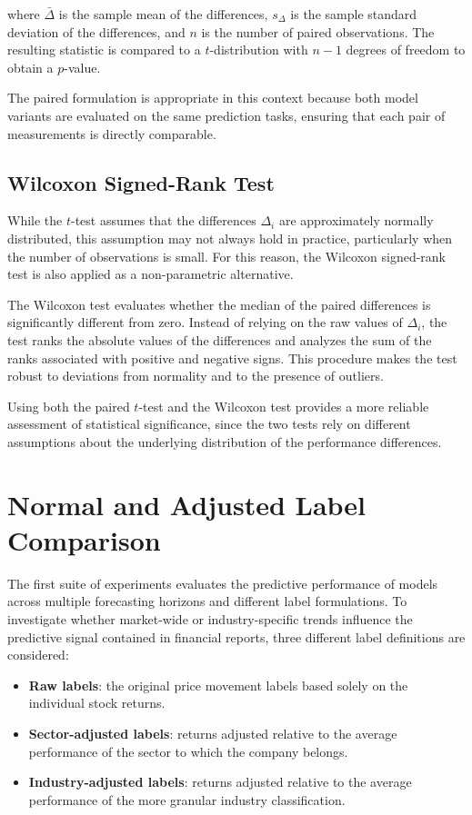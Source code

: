 where $\bar{\Delta}$ is the sample mean of the differences, $s_\Delta$ is the sample standard deviation of the differences, and $n$ is the number of paired observations. The resulting statistic is compared to a $t$-distribution with $n-1$ degrees of freedom to obtain a $p$-value.

The paired formulation is appropriate in this context because both model variants are evaluated on the same prediction tasks, ensuring that each pair of measurements is directly comparable.

\subsection{Wilcoxon Signed-Rank Test}

While the $t$-test assumes that the differences $\Delta_i$ are approximately normally distributed, this assumption may not always hold in practice, particularly when the number of observations is small. For this reason, the Wilcoxon signed-rank test is also applied as a non-parametric alternative.

The Wilcoxon test evaluates whether the median of the paired differences is significantly different from zero. Instead of relying on the raw values of $\Delta_i$, the test ranks the absolute values of the differences and analyzes the sum of the ranks associated with positive and negative signs. This procedure makes the test robust to deviations from normality and to the presence of outliers.

Using both the paired $t$-test and the Wilcoxon test provides a more reliable assessment of statistical significance, since the two tests rely on different assumptions about the underlying distribution of the performance differences.

\section{Normal and Adjusted Label Comparison}

The first suite of experiments evaluates the predictive performance of models across multiple forecasting horizons and different label formulations.
To investigate whether market-wide or industry-specific trends influence the predictive signal contained in financial reports, three different label definitions are considered:

\begin{itemize}
\item \textbf{Raw labels}: the original price movement labels based solely on the individual stock returns.
\item \textbf{Sector-adjusted labels}: returns adjusted relative to the average performance of the sector to which the company belongs.
\item \textbf{Industry-adjusted labels}: returns adjusted relative to the average performance of the more granular industry classification.
\end{itemize}

